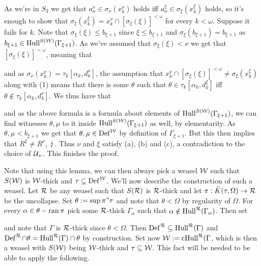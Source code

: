 {As we're in $S_3$ we get that $a_n^\nu\in\sigma_\nu(x_k^\nu)$ holds iff $a_n^\xi\in\sigma_\xi(x_k^\xi)$ holds, so it's enough to show that $\sigma_\xi(x_k^\xi)=x_k^\nu\cap[\sigma_\xi(\xi)]^{<\omega}$ for every $k<\omega$. Suppose it fails for $k$. Note that $\sigma_\xi(\xi)\leq b_{\xi+1}$ since $\xi\leq b_{\xi+1}$ and $\sigma_\xi(b_{\xi+1})=b_{\xi+1}$ as $b_{\xi+1}\in\operatorname{Hull}^{S(\operatorname{\mathcal{W}})}(\Gamma_{\xi+1})$. As we've assumed that $\sigma_\xi(\xi)<\nu$ we get that $[\sigma_\xi(\xi)]^{<\omega}$, meaning that

and as $\sigma_\nu(x_k^\nu)=\tau_k[\alpha_k,d_k^\nu]$, the assumption that $x_k^\nu\cap[\sigma_\xi(\xi)]^{<\omega}\neq\sigma_\xi(x_k^\xi)$ along with (1) means that there is some $\theta$ such that $\theta\in\tau_k[\alpha_k,d_k^\xi]$ iff $\theta\notin\tau_k[\alpha_k,d_k^\nu]$. We thus have that

and as the above formula is a formula about elements of $\operatorname{Hull}^{S(\operatorname{\mathcal{W}})}(\Gamma_{\xi+1})$, we can find witnesses $\theta,\mu$ to it inside $\operatorname{Hull}^{S(\operatorname{\mathcal{W}})}(\Gamma_{\xi+1})$ as well, by elementarity. As $\theta,\mu<b_{\xi+1}$ we get that $\theta,\mu\in\operatorname{Def}^{\operatorname{\mathcal{W}}}$ by definition of $\Gamma_{\xi+1}$. But this then implies that $R^\xi\neq R^\nu$, $\operatorname{\lightning}$. Thus $\nu$ and $\xi$ satisfy (a), (b) and (c), a contradiction to the choice of $\operatorname{\mathcal{U}}_\nu$. This finishes the proof.
}

Note that using this lemma, we can then always pick a weasel $\operatorname{\mathcal{W}}$ such that $S(\operatorname{\mathcal{W}})$ is $\operatorname{\mathcal{W}}$-thick and $\tau\subseteq\operatorname{Def}^{\operatorname{\mathcal{W}}}$. We'll now describe the construction of such a weasel. Let $\operatorname{\mathcal{R}}$ be any weasel such that $S(\operatorname{\mathcal{R}})$ is $\operatorname{\mathcal{R}}$-thick and let $\pi:\tilde K(\tau,\Omega)\to\operatorname{\mathcal{R}}$ be the uncollapse. Set $\theta:=\sup\pi"\tau$ and note that $\theta<\Omega$ by regularity of $\Omega$. For every $\alpha\in\theta-\operatorname{ran}\pi$ pick some $\operatorname{\mathcal{R}}$-thick $\Gamma_\alpha$ such that $\alpha\notin\operatorname{Hull}^{\operatorname{\mathcal{R}}}(\Gamma_\alpha)$. Then set
\eq{
\Gamma:=\bigcap\{\Gamma_\alpha\mid\alpha\in\theta-\ran\pi\}
}

and note that $\Gamma$ is $\operatorname{\mathcal{R}}$-thick since $\theta<\Omega$. Then $\operatorname{Def}^{\operatorname{\mathcal{R}}}\subseteq\operatorname{Hull}^{\operatorname{\mathcal{R}}}(\Gamma)$ and $\operatorname{Def}^{\operatorname{\mathcal{R}}}\cap\theta=\operatorname{Hull}^{\operatorname{\mathcal{R}}}(\Gamma)\cap\theta$ by construction. Set now $\operatorname{\mathcal{W}}:=\operatorname{cHull}^{\operatorname{\mathcal{R}}}(\Gamma$, which is then a weasel with $S(\operatorname{\mathcal{W}})$ being $\operatorname{\mathcal{W}}$-thick and $\tau\subseteq\operatorname{\mathcal{W}}$. This fact will be needed to be able to apply the following.

